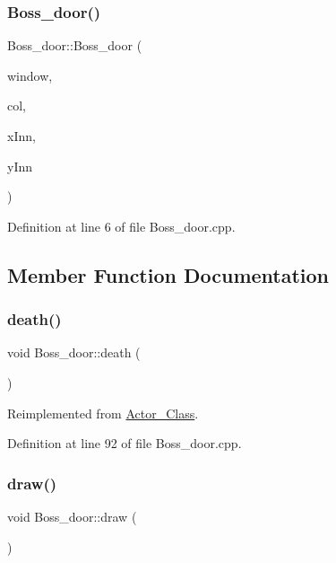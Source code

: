 \subsubsection{\texorpdfstring{Boss\+\_\+door()}{Boss\_door()}}
{\footnotesize\ttfamily Boss\+\_\+door\+::\+Boss\+\_\+door (\begin{DoxyParamCaption}\item[{sf\+::\+Render\+Window \&}]{window,  }\item[{\hyperlink{class_collision}{Collision}}]{col,  }\item[{int}]{x\+Inn,  }\item[{int}]{y\+Inn }\end{DoxyParamCaption})}



Definition at line 6 of file Boss\+\_\+door.\+cpp.



\subsection{Member Function Documentation}
\hypertarget{class_boss__door_acee93d541699ed109dfae8f05f0ea39e}{}\label{class_boss__door_acee93d541699ed109dfae8f05f0ea39e} 
\subsubsection{\texorpdfstring{death()}{death()}}
{\footnotesize\ttfamily void Boss\+\_\+door\+::death (\begin{DoxyParamCaption}{ }\end{DoxyParamCaption})\hspace{0.3cm}{\ttfamily [virtual]}}



Reimplemented from \hyperlink{class_actor___class_a9447c6154a674d7e6bdf24ff2874b7a8}{Actor\+\_\+\+Class}.



Definition at line 92 of file Boss\+\_\+door.\+cpp.

\hypertarget{class_boss__door_a093ca3c013ae4f5f703675bc6d3de9f0}{}\label{class_boss__door_a093ca3c013ae4f5f703675bc6d3de9f0} 
\subsubsection{\texorpdfstring{draw()}{draw()}}
{\footnotesize\ttfamily void Boss\+\_\+door\+::draw (\begin{DoxyParamCaption}{ }\end{DoxyParamCaption})\hspace{0.3cm}{\ttfamily [virtual]}}



